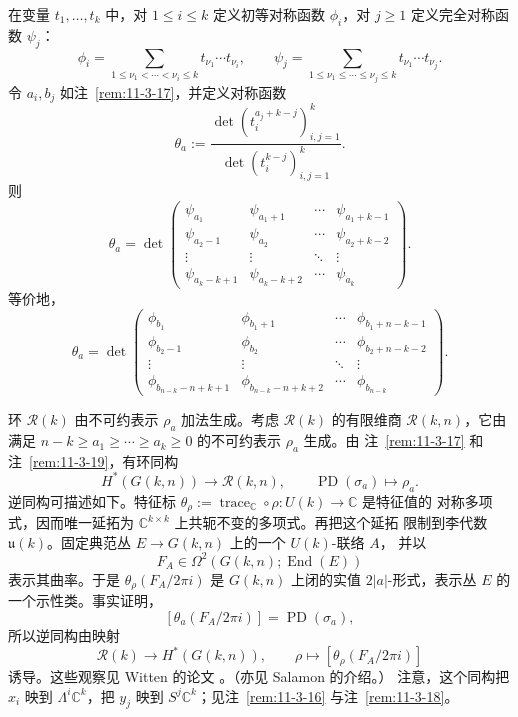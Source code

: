 \begin{remark}\label{rem:11-3-19}
在变量 $t_1,\ldots,t_k$ 中，对 $1\leq i\leq k$ 定义初等对称函数 $\phi_i$，对
$j\geq1$ 定义完全对称函数 $\psi_j$：
\[
  \phi_i=\sum_{1\leq\nu_1<\cdots<\nu_i\leq k}
  t_{\nu_1}\cdots t_{\nu_i},
  \qquad
  \psi_j=\sum_{1\leq\nu_1\leq\cdots\leq\nu_j\leq k}
  t_{\nu_1}\cdots t_{\nu_j}.
\]
令 $a_i,b_j$ 如注~\ref{rem:11-3-17}，并定义对称函数
\[
  \theta_a:=
  \frac{\det(t_i^{a_j+k-j})_{i,j=1}^k}
  {\det(t_i^{k-j})_{i,j=1}^k}.
\]
则
\[
  \theta_a=
  \det\begin{pmatrix}
    \psi_{a_1}&\psi_{a_1+1}&\cdots&\psi_{a_1+k-1}\\
    \psi_{a_2-1}&\psi_{a_2}&\cdots&\psi_{a_2+k-2}\\
    \vdots&\vdots&\ddots&\vdots\\
    \psi_{a_k-k+1}&\psi_{a_k-k+2}&\cdots&\psi_{a_k}
  \end{pmatrix}.
\]
等价地，
\[
  \theta_a=
  \det\begin{pmatrix}
    \phi_{b_1}&\phi_{b_1+1}&\cdots&\phi_{b_1+n-k-1}\\
    \phi_{b_2-1}&\phi_{b_2}&\cdots&\phi_{b_2+n-k-2}\\
    \vdots&\vdots&\ddots&\vdots\\
    \phi_{b_{n-k}-n+k+1}&\phi_{b_{n-k}-n+k+2}&\cdots&\phi_{b_{n-k}}
  \end{pmatrix}.
\]
\end{remark}

环 $\mathcal R(k)$ 由不可约表示 $\rho_a$ 加法生成。考虑 $\mathcal R(k)$ 的有限维商
$\mathcal R(k,n)$，它由满足
$n-k\geq a_1\geq\cdots\geq a_k\geq0$ 的不可约表示 $\rho_a$ 生成。由
注~\ref{rem:11-3-17} 和注~\ref{rem:11-3-19}，有环同构
\begin{equation}\label{eq:11-3-25}
  H^*(G(k,n))\longrightarrow\mathcal R(k,n),
  \qquad \operatorname{PD}(\sigma_a)\longmapsto\rho_a.
\end{equation}
逆同构可描述如下。特征标
$\theta_\rho:=\operatorname{trace}_{\mathbb C}\circ\rho:U(k)\to\mathbb C$ 是特征值的
对称多项式，因而唯一延拓为 $\mathbb C^{k\times k}$ 上共轭不变的多项式。再把这个延拓
限制到李代数 $\mathfrak u(k)$。固定典范丛 $E\to G(k,n)$ 上的一个 $U(k)$-联络 $A$，
并以
\[
  F_A\in\Omega^2(G(k,n);\operatorname{End}(E))
\]
表示其曲率。于是 $\theta_\rho(F_A/2\pi i)$ 是 $G(k,n)$ 上闭的实值
$2|a|$-形式，表示丛 $E$ 的一个示性类。事实证明，
\[
  [\theta_a(F_A/2\pi i)]=\operatorname{PD}(\sigma_a),
\]
所以逆同构由映射
\[
  \mathcal R(k)\longrightarrow H^*(G(k,n)),
  \qquad \rho\longmapsto[\theta_\rho(F_A/2\pi i)]
\]
诱导。这些观察见 Witten 的论文 。（亦见 Salamon  的介绍。）
注意，这个同构把 $x_i$ 映到 $\Lambda^i\mathbb C^k$，把 $y_j$ 映到
$S^j\mathbb C^k$；见注~\ref{rem:11-3-16} 与注~\ref{rem:11-3-18}。

